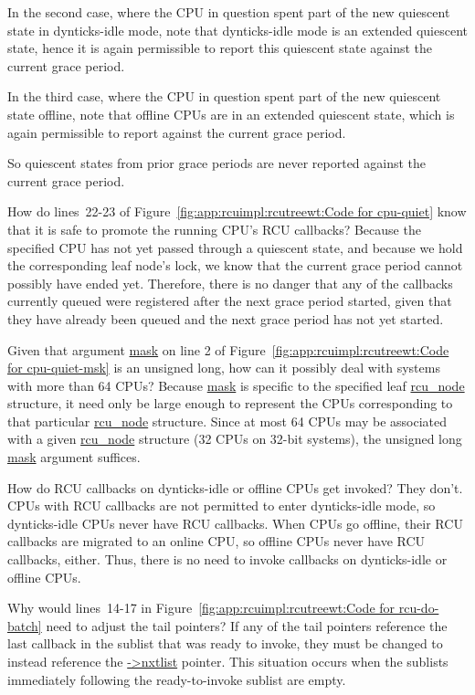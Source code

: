 	In the second case, where the CPU in question spent part of
	the new quiescent state in dynticks-idle mode, note that
	dynticks-idle mode is an extended quiescent state, hence
	it is again permissible to report this quiescent state against
	the current grace period.

	In the third case, where the CPU in question spent part of the
	new quiescent state offline, note that offline CPUs are in
	an extended quiescent state, which is again permissible to
	report against the current grace period.

	So quiescent states from prior grace periods are never reported
	against the current grace period.

\QuickQ{}
	How do lines~22-23 of
	Figure~\ref{fig:app:rcuimpl:rcutreewt:Code for cpu-quiet}
	know that it is safe to promote the running CPU's RCU
	callbacks?
\QuickA{}
	Because the specified CPU has not yet passed through a quiescent
	state, and because we hold the corresponding leaf node's lock,
	we know that the current grace period cannot possibly have
	ended yet.
	Therefore, there is no danger that any of the callbacks currently
	queued were registered after the next grace period started, given
	that they have already been queued and the next grace period
	has not yet started.

\QuickQ{}
	Given that argument \url{mask} on line 2 of
	Figure~\ref{fig:app:rcuimpl:rcutreewt:Code for cpu-quiet-msk}
	is an unsigned long, how can it possibly deal with systems
	with more than 64 CPUs?
\QuickA{}
	Because \url{mask} is specific to the specified leaf \url{rcu_node}
	structure, it need only be large enough to represent the
	CPUs corresponding to that particular \url{rcu_node} structure.
	Since at most 64 CPUs may be associated with a given
	\url{rcu_node} structure (32 CPUs on 32-bit systems),
	the unsigned long \url{mask} argument suffices.

\QuickQ{}
	How do RCU callbacks on dynticks-idle or offline CPUs
	get invoked?
\QuickA{}
	They don't.
	CPUs with RCU callbacks are not permitted to enter dynticks-idle
	mode, so dynticks-idle CPUs never have RCU callbacks.
	When CPUs go offline, their RCU callbacks are migrated to
	an online CPU, so offline CPUs never have RCU callbacks, either.
	Thus, there is no need to invoke callbacks on dynticks-idle
	or offline CPUs.

\QuickQ{}
	Why would lines~14-17 in
	Figure~\ref{fig:app:rcuimpl:rcutreewt:Code for rcu-do-batch}
	need to adjust the tail pointers?
\QuickA{}
	If any of the tail pointers reference the last callback
	in the sublist that was ready to invoke, they must be
	changed to instead reference the \url{->nxtlist} pointer.
	This situation occurs when the sublists
	immediately following the ready-to-invoke sublist are empty.


